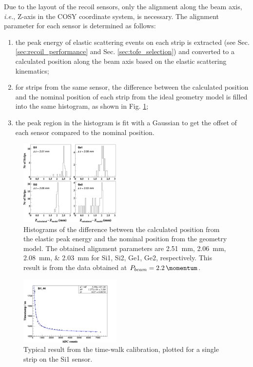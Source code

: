 \documentclass[number,5p]{elsarticle}
\begin{document}
Due to the layout of the recoil sensors, only the alignment along
the beam axis, \textit{i.e.}, Z-axis in the COSY coordinate system, is necessary.
The alignment parameter for each sensor is determined as follows:
\begin{enumerate}
\item the peak energy of elastic scattering events on each strip is extracted
  (see Sec. \ref{sec:recoil_performance} and Sec. \ref{sec:tofe_selection}) and converted to a calculated position along the beam axis based on the elastic
  scattering kinematics;
\item for strips from the same sensor, the difference between the calculated
  position and the nominal position of each strip from the ideal geometry model is filled into the same histogram, as shown in Fig. \ref{fig:alignment};
\item the peak region in the histogram is fit with a Gaussian to get the offset
  of each sensor compared to the nominal position.
\end{enumerate}
\begin{figure}[h!]
  \centering
  \includegraphics[width=0.45\textwidth]{./alignment_reorder.png}
  \caption{Histograms of the difference between the calculated position from the
    elastic peak energy and the nominal position from the geometry model.
    The obtained alignment parameters are
    \SIlist[list-units=single]{2.51;2.06;2.08;2.03}{\mm} for Si1, Si2, Ge1, Ge2, respectively.
    This result is from the data obtained at $P_{beam} =
    \SI{2.2}{\momentum}$.}
  \label{fig:alignment}
\end{figure}

\begin{figure}[h!]
  \centering
  \includegraphics[width=0.45\textwidth]{./timewalk.png}
  \caption{Typical result from the time-walk calibration, plotted for a single
    strip on the Si1 sensor.}
  \label{fig:timewalk}
\end{figure}
\end{document}
